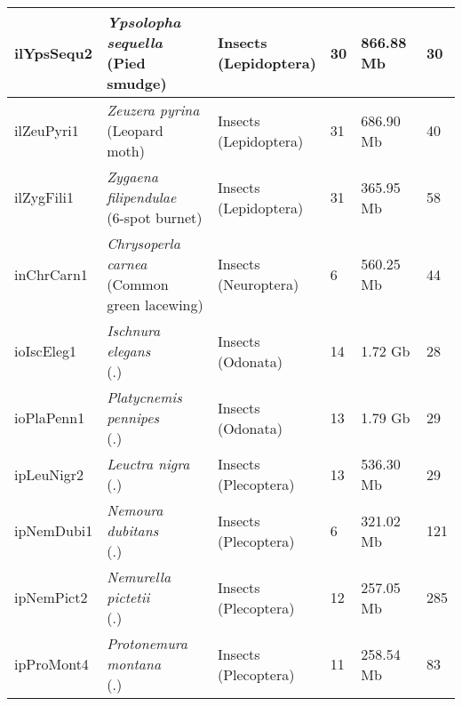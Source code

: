 \begin{centering}
\begin{longtable}{l|l|l|l|l|l}
ilYpsSequ2 & \makecell[{l}]{\textit{Ypsolopha sequella} \\ (Pied smudge)} & \makecell[{l}]{Insects \\ (Lepidoptera)} & 30 & 866.88 Mb & 30  \\ \hline
ilZeuPyri1 & \makecell[{l}]{\textit{Zeuzera pyrina} \\ (Leopard moth)} & \makecell[{l}]{Insects \\ (Lepidoptera)} & 31 & 686.90 Mb & 40  \\ \hline
ilZygFili1 & \makecell[{l}]{\textit{Zygaena filipendulae} \\ (6-spot burnet)} & \makecell[{l}]{Insects \\ (Lepidoptera)} & 31 & 365.95 Mb & 58  \\ \hline
inChrCarn1 & \makecell[{l}]{\textit{Chrysoperla carnea} \\ (Common green lacewing)} & \makecell[{l}]{Insects \\ (Neuroptera)} & 6 & 560.25 Mb & 44  \\ \hline
ioIscEleg1 & \makecell[{l}]{\textit{Ischnura elegans} \\ (.)} & \makecell[{l}]{Insects \\ (Odonata)} & 14 & 1.72 Gb & 28  \\ \hline
ioPlaPenn1 & \makecell[{l}]{\textit{Platycnemis pennipes} \\ (.)} & \makecell[{l}]{Insects \\ (Odonata)} & 13 & 1.79 Gb & 29  \\ \hline
ipLeuNigr2 & \makecell[{l}]{\textit{Leuctra nigra} \\ (.)} & \makecell[{l}]{Insects \\ (Plecoptera)} & 13 & 536.30 Mb & 29  \\ \hline
ipNemDubi1 & \makecell[{l}]{\textit{Nemoura dubitans} \\ (.)} & \makecell[{l}]{Insects \\ (Plecoptera)} & 6 & 321.02 Mb & 121  \\ \hline
ipNemPict2 & \makecell[{l}]{\textit{Nemurella pictetii} \\ (.)} & \makecell[{l}]{Insects \\ (Plecoptera)} & 12 & 257.05 Mb & 285  \\ \hline
ipProMont4 & \makecell[{l}]{\textit{Protonemura montana} \\ (.)} & \makecell[{l}]{Insects \\ (Plecoptera)} & 11 & 258.54 Mb & 83  \\ \hline

\end{longtable}
\end{centering}
